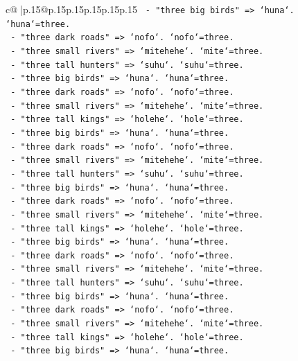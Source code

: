 \documentclass{article}
\begin{document}
{\begin{supertabular}{c@{$\;$}|p{.15\linewidth}@{}p{.15\linewidth}p{.15\linewidth}p{.15\linewidth}p{.15\linewidth}p{.15\linewidth}}
{{{\texttt{      {-} "three big birds" => `huna`. `huna`=three.} \\
\texttt{      {-} "three dark roads" => `nofo`. `nofo`=three.} \\
\texttt{      {-} "three small rivers" => `mitehehe`. `mite`=three.} \\
\texttt{      {-} "three tall hunters" => `suhu`. `suhu`=three.} \\
\texttt{      {-} "three big birds" => `huna`. `huna`=three.} \\
\texttt{      {-} "three dark roads" => `nofo`. `nofo`=three.} \\
\texttt{      {-} "three small rivers" => `mitehehe`. `mite`=three.} \\
\texttt{      {-} "three tall kings" => `holehe`. `hole`=three.} \\
\texttt{      {-} "three big birds" => `huna`. `huna`=three.} \\
\texttt{      {-} "three dark roads" => `nofo`. `nofo`=three.} \\
\texttt{      {-} "three small rivers" => `mitehehe`. `mite`=three.} \\
\texttt{      {-} "three tall hunters" => `suhu`. `suhu`=three.} \\
\texttt{      {-} "three big birds" => `huna`. `huna`=three.} \\
\texttt{      {-} "three dark roads" => `nofo`. `nofo`=three.} \\
\texttt{      {-} "three small rivers" => `mitehehe`. `mite`=three.} \\
\texttt{      {-} "three tall kings" => `holehe`. `hole`=three.} \\
\texttt{      {-} "three big birds" => `huna`. `huna`=three.} \\
\texttt{      {-} "three dark roads" => `nofo`. `nofo`=three.} \\
\texttt{      {-} "three small rivers" => `mitehehe`. `mite`=three.} \\
\texttt{      {-} "three tall hunters" => `suhu`. `suhu`=three.} \\
\texttt{      {-} "three big birds" => `huna`. `huna`=three.} \\
\texttt{      {-} "three dark roads" => `nofo`. `nofo`=three.} \\
\texttt{      {-} "three small rivers" => `mitehehe`. `mite`=three.} \\
\texttt{      {-} "three tall kings" => `holehe`. `hole`=three.} \\
\texttt{      {-} "three big birds" => `huna`. `huna`=three.} \\
}}}
\end{supertabular}}
\end{document}
